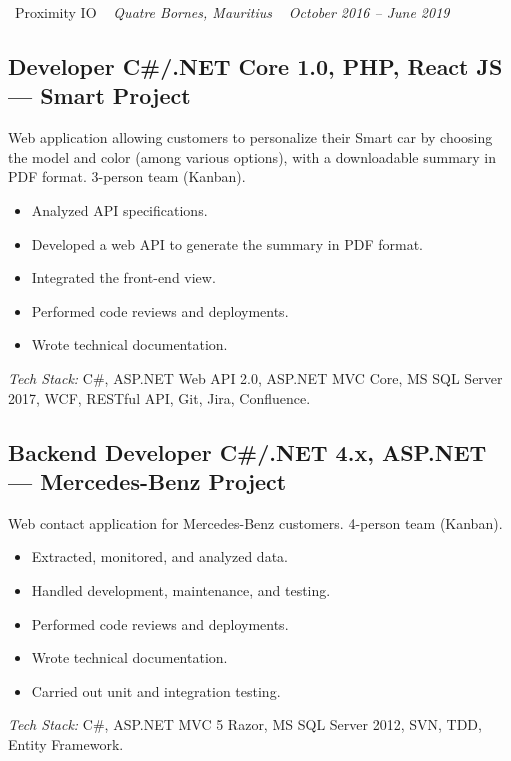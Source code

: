 \documentclass[10pt,a4paper]{article}
\begin{document}
\vspace{10pt}

\noindent\textcolor{primary}{ \faBuilding\ Proximity IO} \quad
\textit{ \small \textcolor{darkgray}{ \faMapMarker\ } Quatre Bornes, Mauritius } \hfill
\textit{ \small \textcolor{darkgray}{ \faCalendar\ } October 2016 -- June 2019 }

\vspace{4pt}

\subsection*{Developer C\#/.NET Core 1.0, PHP, React JS --- Smart Project}
\color{darkgray}
Web application allowing customers to personalize their Smart car by choosing the model and color (among various options), with a downloadable summary in PDF format. 3-person team (Kanban).
\begin{itemize}
  \item Analyzed API specifications.
  \item Developed a web API to generate the summary in PDF format.
  \item Integrated the front-end view.
  \item Performed code reviews and deployments.
  \item Wrote technical documentation.
\end{itemize}
\textit{Tech Stack:} C\#, ASP.NET Web API 2.0, ASP.NET MVC Core, MS SQL Server 2017, WCF, RESTful API, Git, Jira, Confluence.

\vspace{6pt}

\subsection*{Backend Developer C\#/.NET 4.x, ASP.NET --- Mercedes-Benz Project}
\color{darkgray}
Web contact application for Mercedes-Benz customers. 4-person team (Kanban).
\begin{itemize}
  \item Extracted, monitored, and analyzed data.
  \item Handled development, maintenance, and testing.
  \item Performed code reviews and deployments.
  \item Wrote technical documentation.
  \item Carried out unit and integration testing.
\end{itemize}
\textit{Tech Stack:} C\#, ASP.NET MVC 5 Razor, MS SQL Server 2012, SVN, TDD, Entity Framework.
\end{document}

